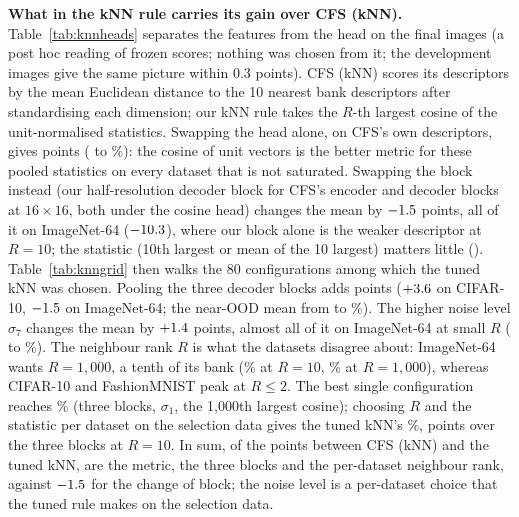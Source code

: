 \documentclass[10pt]{article}
\begin{document}
\textbf{What in the kNN rule carries its gain over CFS (kNN).} Table~\ref{tab:knnheads} separates the features from the head on the final images (a post hoc reading of frozen scores; nothing was chosen from it; the development images give the same picture within 0.3 points). CFS (kNN) scores its descriptors by the mean Euclidean distance to the 10 nearest bank descriptors after standardising each dimension; our kNN rule takes the $R$-th largest cosine of the unit-normalised statistics. Swapping the head alone, on CFS's own descriptors, gives \featHeadGain{} points (\cfsKnnMean{} to \featCfsCos\%): the cosine of unit vectors is the better metric for these pooled statistics on every dataset that is not saturated. Swapping the block instead (our half-resolution decoder block for CFS's encoder and decoder blocks at $16\times16$, both under the cosine head) changes the mean by $-1.5$ points, all of it on ImageNet-64 ($-10.3$), where our block alone is the weaker descriptor at $R=10$; the statistic (10th largest or mean of the 10 largest) matters little (\featStatMean). Table~\ref{tab:knngrid} then walks the 80 configurations among which the tuned kNN was chosen. Pooling the three decoder blocks adds \featThreeGain{} points ($+3.6$ on CIFAR-10, $-1.5$ on ImageNet-64; the near-OOD mean from \featNearBasic{} to \featNearThree\%). The higher noise level $\sigma_7$ changes the mean by $+1.4$ points, almost all of it on ImageNet-64 at small $R$ (\featInSigOne{} to \featInSigSeven\%). The neighbour rank $R$ is what the datasets disagree about: ImageNet-64 wants $R=1{,}000$, a tenth of its bank (\featInRten\% at $R=10$, \featInRthousand\% at $R=1{,}000$), whereas CIFAR-10 and FashionMNIST peak at $R\le2$. The best single configuration reaches \featBestSingle\% (three blocks, $\sigma_1$, the 1{,}000th largest cosine); choosing $R$ and the statistic per dataset on the selection data gives the tuned kNN's \tunedMean\%, \featRankGain{} points over the three blocks at $R=10$. In sum, of the \featGap{} points between CFS (kNN) and the tuned kNN, \featHeadGain{} are the metric, \featThreeGain{} the three blocks and \featRankGain{} the per-dataset neighbour rank, against $-1.5$ for the change of block; the noise level is a per-dataset choice that the tuned rule makes on the selection data.
\end{document}
